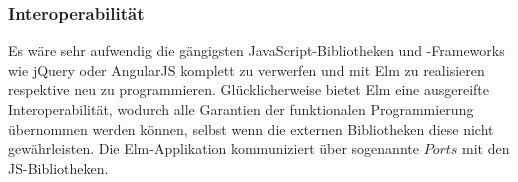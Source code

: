 \subsubsection{Interoperabilität}
\label{sec:Interoperabilität}
Es wäre sehr aufwendig die gängigsten JavaScript-Bibliotheken und -Frameworks wie jQuery oder AngularJS komplett zu verwerfen und mit Elm zu realisieren respektive neu zu programmieren. Glücklicherweise bietet Elm eine ausgereifte Interoperabilität, wodurch alle Garantien der funktionalen Programmierung übernommen werden können, selbst wenn die externen Bibliotheken diese nicht gewährleisten. Die Elm-Applikation kommuniziert über sogenannte $Ports$ mit den \ac{JS}-Bibliotheken.



